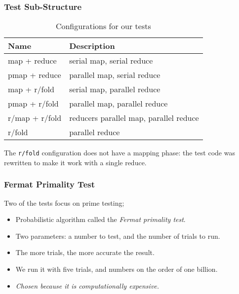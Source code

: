 \documentclass{beamer}
\newcommand{\clocode}[1]{{\texttt {#1}}}
\begin{document}
\begin{frame}
\frametitle{Test Sub-Structure}
\begin{table}
\begin{center}
\begin{tabular}{|l|l|}
\hline 
Name & Description \\
\hline
map + reduce & serial map, serial reduce \\
pmap + reduce & parallel map, serial reduce \\
map + r/fold & serial map, parallel reduce \\
pmap + r/fold & parallel map, parallel reduce\\
r/map + r/fold & reducers parallel map, parallel reduce\\
r/fold & parallel reduce\\
\hline
\end{tabular}
\end{center}
\caption{Configurations for our tests}\label{table:tests}
\end{table}
The \clocode{r/fold} configuration does not have a mapping phase: the test code was rewritten to make it work with a single reduce.
\end{frame}
\begin{frame}
\frametitle{Fermat Primality Test}
Two of the tests focus on prime testing;
	\begin{itemize}
	\item  Probabilistic algorithm called the \emph{Fermat primality test}.
	\item Two parameters: a number to test, and the number of trials to run.
	\item The more trials, the more accurate the result.
	\item We run it with five trials, and numbers on the order of one billion.
	\item \emph{Chosen because it is computationally expensive.}
	\end{itemize}
\end{frame}
\end{document}

